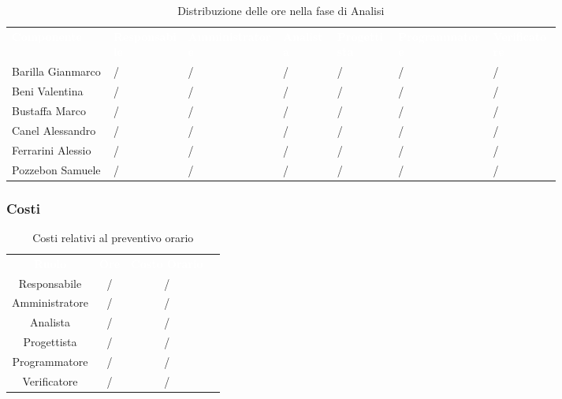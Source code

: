 \begin{table}[htb]
    \centering
    {\renewcommand{\arraystretch}{1.5}
    \scriptsize
    \begin{tabular}{p{0.15\linewidth}p{0.11\linewidth}p{0.14\linewidth}p{0.08\linewidth}p{0.09\linewidth}p{0.14\linewidth}p{0.10\linewidth}}
	    \rowcolor[RGB]{33, 73, 50}
	    \textcolor{white}{\textbf{Componente}} & \textcolor{white}{\textbf{Responsabile}} & \textcolor{white}
	    {\textbf{Amministratore}} & \textcolor{white}{\textbf{Analista}} & \textcolor{white}
	    {\textbf{Progettista}} & \textcolor{white}{\textbf{Programmatore}} & \textcolor{white}{\textbf{Verificatore}}\\
	    \rowcolor[RGB]{216, 235, 171}
	    Barilla Gianmarco & / & / & / & / & / & /		\\
	    \rowcolor[RGB]{233, 245, 206}
	    Beni Valentina & / & / & / & / & / & /		\\
	    \rowcolor[RGB]{216, 235, 171}
	    Bustaffa Marco & / & / & / & / & / & /		\\
        \rowcolor[RGB]{233, 245, 206}
	    Canel Alessandro & / & / & / & / & / & /		\\
        \rowcolor[RGB]{216, 235, 171}
	    Ferrarini Alessio & / & / & / & / & / & /		\\
        \rowcolor[RGB]{233, 245, 206}
	    Pozzebon Samuele & / & / & / & / & / & /		\\
    \end{tabular}	
}
\caption{Distribuzione delle ore nella fase di Analisi}
\end{table}

\newpage
\subsubsection{Costi}

\begin{table}[htb]
    \centering
    {\renewcommand{\arraystretch}{1.5}
    \begin{tabular}{cccc}
	    \rowcolor[RGB]{33, 73, 50}
	    \textcolor{white}{\textbf{Ruolo}} & \textcolor{white}{\textbf{Ore}} & \textcolor{white}{\textbf{Costo Orario}}\\
	    \rowcolor[RGB]{216, 235, 171}
	    Responsabile & / & /\\
	    \rowcolor[RGB]{233, 245, 206}
	    Amministratore & / & /\\
        \rowcolor[RGB]{216, 235, 171}
	    Analista & / & /\\
	    \rowcolor[RGB]{233, 245, 206}
	    Progettista & / & /\\
        \rowcolor[RGB]{216, 235, 171}
	    Programmatore & / & /\\
	    \rowcolor[RGB]{233, 245, 206}
	    Verificatore & / & /\\
    \end{tabular}	
    }
\caption{Costi relativi al preventivo orario}
\end{table}